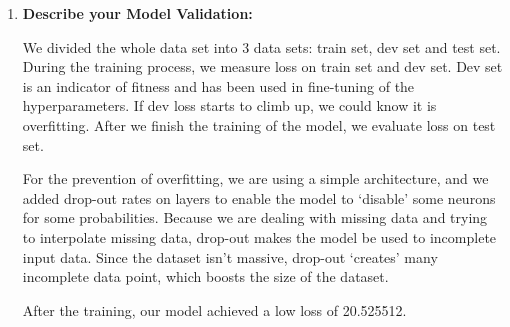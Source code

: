 \documentclass[11pt, a4paper]{article}
\begin{document}
\begin{enumerate}
	\item {\textbf{Describe your Model Validation:}}
	\par{We divided the whole data set into 3 data sets: train set, dev set and test set. During the training process, we measure loss on train set and dev set. Dev set is an indicator of fitness and has been used in fine-tuning of the hyperparameters. If dev loss starts to climb up, we could know it is overfitting. After we finish the training of the model, we evaluate loss on test set.}
	\par{For the prevention of overfitting, we are using a simple architecture, and we added drop-out rates on layers to enable the model to `disable' some neurons for some probabilities. Because we are dealing with missing data and trying to interpolate missing data, drop-out makes the model be used to incomplete input data. Since the dataset isn't massive, drop-out `creates' many incomplete data point, which boosts the size of the dataset.}
	\par{After the training, our model achieved a low loss of 20.525512.}
	

\end{enumerate}
\end{document}
